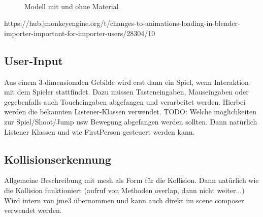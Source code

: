 \begin{figure}[h]
	\myfloatalign
	 \quad
	 \\
	\caption[Bilder.]{Modell mit und ohne Material}\label{fig:example}
\end{figure}

\bigskip

https://hub.jmonkeyengine.org/t/changes-to-animations-loading-in-blender-importer-important-for-importer-users/28304/10



\subsection{User-Input}

Aus einem 3-dimensionalen Gebilde wird erst dann ein Spiel, wenn Interaktion mit dem Spieler stattfindet. Dazu müssen Tasteneingaben, Mauseingaben oder gegebenfalls auch Toucheingaben abgefangen und verarbeitet werden.
Hierbei werden die bekannten Listener-Klassen verwendet.
TODO:
Welche möglichkeiten zur Spiel/Shoot/Jump usw Bewegung abgefangen werden sollten.
Dann natürlich Listener Klassen und wie FirstPerson gesteuert werden kann.

\subsection{Kollisionserkennung}
Allgemeine Beschreibung mit mesh als Form für die Kollision. Dann natürlich wie die Kollision funktioniert (aufruf von Methoden overlap, dann nicht weiter...)
Wird intern von jme3 übernommen und kann auch direkt im scene composer verwendet werden.

